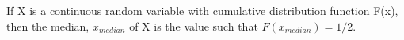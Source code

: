 If X is a continuous random variable with cumulative distribution
function F(x), then the median, $x_{median}$  of X is the 
value such that $F(x_{median})=1/2.$ 